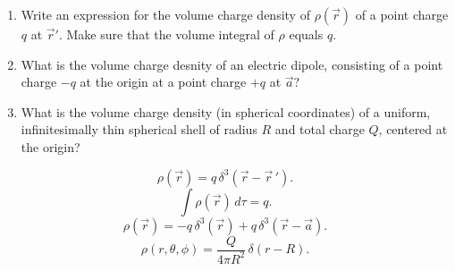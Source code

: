 \begin{hwkProblem}{1.47}{}

	\begin{enumerate}
		\item Write an expression for the volume charge density of \( \rho \left( \vec{r} \right) \) of a point charge \( q \) at \( \vec{r}' \). Make sure that the volume integral of \( \rho \) equals \( q \).
		\item What is the volume charge desnity of an electric dipole, consisting of a point charge \( -q \) at the origin at a point charge \( +q \) at \( \vec{a} \)?
		\item What is the volume charge density (in spherical coordinates) of a uniform, infinitesimally thin spherical shell of radius \( R \) and total charge \( Q \), centered at the origin?
	\end{enumerate}

	\hwkSol
	\hwkPart
	\[
		\rho(\vec{r})=q\,\delta^3(\vec{r}-\vec{r}\,').
	\]
	\[
		\int \rho(\vec{r})\,d\tau = q.
	\]
	\hwkPart
	\[
		\rho(\vec{r})=-q\,\delta^3(\vec{r})+q\,\delta^3(\vec{r}-\vec{a}).
	\]
	\hwkPart
	\[
		\rho(r,\theta,\phi)=\frac{Q}{4\pi R^2}\,\delta(r-R).
	\]
\end{hwkProblem}

